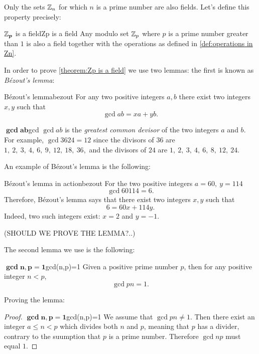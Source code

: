 Only the sets $\mathbb{Z}_{n}$ for which $n$ is a prime number are also fields. Let's define this property precisely:

\begin{theorem}{$\bm{\mathbb{Z}_{p}}$ is a field}{Zp is a field}
	Any modulo set $\mathbb{Z}_{p}$ where $p$ is a prime number greater than $1$ is also a field together with the operations as defined in \autoref{def:operations in Zn}.
\end{theorem}

In order to prove \autoref{theorem:Zp is a field} we use two lemmas: the first is known as \emph{B\'ezout’s lemma}:
\begin{lemma}{B\'ezout's lemma}{bezout}
	For any two positive integers $a,b$ there exist two integers $x,y$ such that
	\[
		\gcd{a}{b} = xa+yb.
	\]
\end{lemma}

\begin{note}{$\bm{\gcd{a}{b}}$}{gcd}
	$\gcd{a}{b}$ is the \emph{greatest common devisor} of the two integers $a$ and $b$. For example, $\gcd{36}{24}=12$ since the divisors of $36$ are $1,\ 2,\ 3,\ 4,\ 6,\ 9,\ 12,\ 18,\ 36$,\ and the divisors of $24$ are $1,\ 2,\ 3,\ 4,\ 6,\ 8,\ 12,\ 24$.
\end{note}

An example of B\'ezout's lemma is the following:

\begin{example}{B\'ezout's lemma in action}{bezout}
	For the two positive integers $a=60,\ y=114$
	\[
		\gcd{60}{114}=6.
	\]
	Therefore, B\'ezout's lemma says that there exist two integers $x,y$ such that
	\[
		6 = 60x + 114y.
	\]
	Indeed, two such integers exist: $x=2$ and $y=-1$.
\end{example}
(SHOULD WE PROVE THE LEMMA?..)

The second lemma we use is the following:
\begin{lemma}{$\bm{\gcd{n,p}=1}$}{gcd(n,p)=1}
	Given a positive prime number $p$, then for any positive integer $n<p$,
	\[
		\gcd{p}{n}=1.
	\]
\end{lemma}

Proving the lemma:
\begin{proof}{$\bm{\gcd{n,p}=1}$}{gcd(n,p)=1}
	We assume that $\gcd{p}{n} \neq 1$. Then there exist an integer $a\leq n<p$ which divides both $n$ and $p$, meaning that $p$ has a divider, contrary to the suumption that $p$ is a prime number. Therefore $\gcd{n}{p}$ must equal $1$.
\end{proof}

